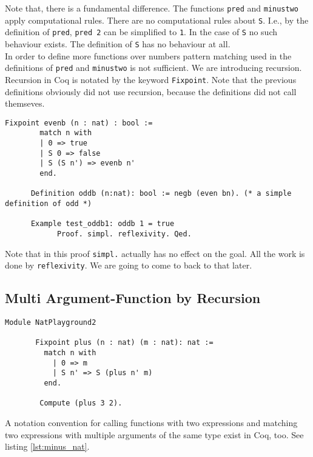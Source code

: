 	     
	  Note that, there is a fundamental difference.
	  The functions \lstinline!pred! and \lstinline!minustwo! apply computational rules. 
	  There are no computational rules about \lstinline!S!.
	  I.e., by the definition of \lstinline!pred!, \lstinline!pred 2! can be simplified to \lstinline!1!. 
	  In the case of \lstinline!S! no such behaviour exists.
	  The definition of \lstinline!S! has no behaviour at all.\\     
	  
	  In order to define more functions over numbers pattern matching used in the definitions of \lstinline!pred! and \lstinline!minustwo! is not sufficient. We are introducing recursion.
	  Recursion in Coq is notated by the keyword \lstinline!Fixpoint!. Note that the previous definitions obviously did not use recursion, because the definitions did not call themseves.
	  
	  \begin{lstlisting}[caption = \lstinline!evenb! and \lstinline!oddb!]
	  Fixpoint evenb (n : nat) : bool :=
	  	match n with
	  	| 0 => true
	  	| S 0 => false
	  	| S (S n') => evenb n'
	  	end.
	  	
	  Definition oddb (n:nat): bool := negb (even bn). (* a simple definition of odd *)
	  	
	  Example test_oddb1: oddb 1 = true
	    	Proof. simpl. reflexivity. Qed.
	  \end{lstlisting}
	   Note that in this proof \lstinline!simpl.! actually has no effect on the goal. 
	   All the work is done by \lstinline!reflexivity!. 
	   We are going to come to back to that later.

	   
   \subsection{Multi Argument-Function by Recursion}
	   
	   \begin{lstlisting}[caption = \lstinline!plus!, label=lst:plus]
	   Module NatPlayground2
	   
	   Fixpoint plus (n : nat) (m : nat): nat :=
	     match n with
	       | 0 => m
	       | S n' => S (plus n' m)
	     end.
	     
	    Compute (plus 3 2).
	   \end{lstlisting}   
	    A notation convention for calling functions with two expressions and matching two expressions with multiple arguments of the same type exist in Coq, too. 
	    See listing \ref{lst:minus_nat}.
	    
